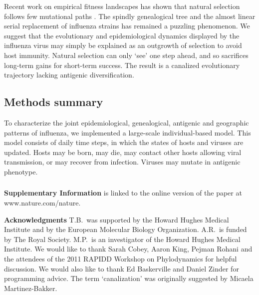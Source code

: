 Recent work on empirical fitness landscapes has shown that natural selection follows few mutational paths \cite{Weinreich06}.  The spindly genealogical tree and the almost linear serial replacement of influenza strains has remained a puzzling phenomenon.  We suggest that the evolutionary and epidemiological dynamics displayed by the influenza virus may simply be explained as an outgrowth of selection to avoid host immunity.  Natural selection can only `see' one step ahead, and so sacrifices long-term gains for short-term success.  The result is a canalized evolutionary trajectory lacking antigenic diversification.

\subsection*{Methods summary}

To characterize the joint epidemiological, genealogical, antigenic and geographic patterns of influenza, we implemented a large-scale individual-based model.  This model consists of daily time steps, in which the states of hosts and viruses are updated.  Hosts may be born, may die, may contact other hosts allowing viral transmission, or may recover from infection.  Viruses may mutate in antigenic phenotype.




\subsubsection*{}
\noindent \textbf{Supplementary Information} is linked to the online version of the paper at www.nature.com/nature.

\vspace{0.3cm}

\noindent \textbf{Acknowledgments} T.B.\ was supported by the Howard Hughes Medical Institute and by the European Molecular Biology Organization.  A.R.\ is funded by The Royal Society.  M.P.\ is an investigator of the Howard Hughes Medical Institute.  We would like to thank Sarah Cobey, Aaron King, Pejman Rohani and the attendees of the 2011 RAPIDD Workshop on Phylodynamics for helpful discussion.  We would also like to thank Ed Baskerville and Daniel Zinder for programming advice.  The term `canalization' was originally suggested by Micaela Martinez-Bakker. 

\vspace{0.3cm}

